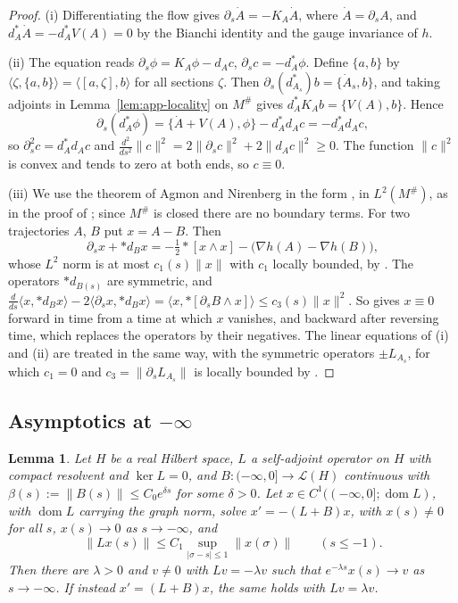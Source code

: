 \documentclass[11pt]{amsart}
\newtheorem{lemma}[theorem]{Lemma}
\theoremstyle{definition}
\theoremstyle{remark}
\theoremstyle{plain}
\numberwithin{equation}{section}
\begin{document}
\begin{proof}
(i) Differentiating the flow gives $\partial_s\dot A=-K_A\dot A$, where $\dot A=\partial_sA$, and
$d_A^*\dot A=-d_A^*V(A)=0$ by the Bianchi identity and the gauge invariance of $h$.

(ii) The equation reads $\partial_s\phi=K_A\phi-d_Ac$, $\partial_sc=-d_A^*\phi$. Define $\{a,b\}$
by $\langle\zeta,\{a,b\}\rangle=\langle[a,\zeta],b\rangle$ for all sections $\zeta$. Then
$\partial_s(d^*_{A_s})b=\{\dot A_s,b\}$, and taking adjoints in Lemma~\ref{lem:app-locality} on
$M^\#$ gives $d_A^*K_Ab=\{V(A),b\}$. Hence
\[
\partial_s(d_A^*\phi)=\{\dot A+V(A),\phi\}-d_A^*d_Ac=-d_A^*d_Ac ,
\]
so $\partial_s^2c=d_A^*d_Ac$ and
$\tfrac{d^2}{ds^2}\|c\|^2=2\|\partial_sc\|^2+2\|d_Ac\|^2\ge0$. The function $\|c\|^2$ is convex
and tends to zero at both ends, so $c\equiv0$.

(iii) We use the theorem of Agmon and Nirenberg in the form \cite[Theorem~C.1]{SW-lagrangian},
in $L^2(M^\#)$, as in the proof of \cite[Proposition~8.6]{SW-lagrangian}; since $M^\#$ is closed
there are no boundary terms. For two trajectories $A$, $B$ put $x=A-B$. Then
\[
\partial_sx+*d_{B}x=-\tfrac12*[x\wedge x]-\bigl(\nabla h(A)-\nabla h(B)\bigr),
\]
whose $L^2$ norm is at most $c_1(s)\|x\|$ with $c_1$ locally bounded, by
\cite[Proposition~6.1(ii)]{DFL}. The operators $*d_{B(s)}$ are symmetric, and
$\tfrac{d}{ds}\langle x,*d_Bx\rangle-2\langle\partial_sx,*d_Bx\rangle=\langle
x,*[\partial_sB\wedge x]\rangle\le c_3(s)\|x\|^2$. So \cite[Theorem~C.1(i)]{SW-lagrangian}
gives $x\equiv0$ forward in time from a time at which $x$ vanishes, and backward after
reversing time, which replaces the operators by their negatives. The linear equations of (i)
and (ii) are treated in the same way, with the symmetric operators $\pm L_{A_s}$, for which
$c_1=0$ and $c_3=\|\partial_sL_{A_s}\|$ is locally bounded by \cite[Proposition~6.1(iii)]{DFL}.
\end{proof}

\subsection{Asymptotics at $-\infty$}

\begin{lemma}\label{lem:app-asymptotics}
Let $H$ be a real Hilbert space, $L$ a self-adjoint operator on $H$ with compact resolvent and
$\ker L=0$, and $B\colon(-\infty,0]\to\mathcal L(H)$ continuous with
$\beta(s):=\|B(s)\|\le C_0e^{\delta s}$ for some $\delta>0$. Let
$x\in C^1((-\infty,0];\operatorname{dom}L)$, with $\operatorname{dom}L$ carrying the graph norm,
solve $x'=-(L+B)x$, with $x(s)\ne0$ for all $s$, $x(s)\to0$ as $s\to-\infty$, and
\begin{equation}\label{eq:app-R}
\|Lx(s)\|\le C_1\sup_{|\sigma-s|\le1}\|x(\sigma)\|\qquad(s\le-1).
\end{equation}
Then there are $\lambda>0$ and $v\ne0$ with $Lv=-\lambda v$ such that $e^{-\lambda s}x(s)\to v$ as
$s\to-\infty$. If instead $x'=(L+B)x$, the same holds with $Lv=\lambda v$.
\end{lemma}
\end{document}

